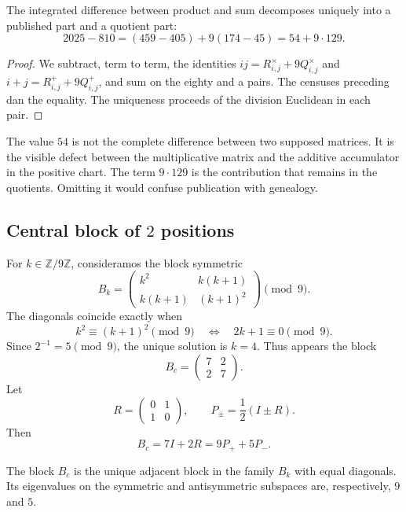 \begin{theorem}
\label{p12-83-c1-s1:thm:app-separacion-exceso}
The integrated difference between product and sum decomposes uniquely
into a published part and a quotient part:
\[
 \boxed{
  2025-810
  =(459-405)+9(174-45)
  =54+9\cdot129.}
\]
\end{theorem}

\begin{proof}
We subtract, term to term, the identities
\(ij=R^\times_{i,j}+9Q^\times_{i,j}\) and
\(i+j=R^+_{i,j}+9Q^+_{i,j}\), and sum on the eighty and a pairs. The
censuses preceding dan the equality. The uniqueness proceeds of the division
Euclidean in each pair.
\end{proof}

The value \(54\) is not the complete difference between two supposed matrices.
It is the visible defect between the multiplicative matrix and the additive accumulator
in the positive chart. The term \(9\cdot129\) is the contribution
that remains in the quotients. Omitting it would confuse publication with
genealogy.

\subsection{Central block of \(2\) positions}

For \(k\in\mathbb Z/9\mathbb Z\), consideramos the block symmetric
\[
 B_k=
 \begin{pmatrix}
  k^2&k(k+1)\\
  k(k+1)&(k+1)^2
 \end{pmatrix}\pmod9.
\]
The diagonals coincide exactly when
\[
 k^2\equiv(k+1)^2\pmod9
 \quad\Longleftrightarrow\quad
 2k+1\equiv0\pmod9.
\]
Since \(2^{-1}=5\pmod9\), the unique solution is \(k=4\). Thus appears the
block
\[
 B_c=
 \begin{pmatrix}7&2\\2&7\end{pmatrix}.
\]
Let
\[
 R=\begin{pmatrix}0&1\\1&0\end{pmatrix},
 \qquad
 P_\pm=\frac12(I\pm R).
\]
Then
\[
 B_c=7I+2R=9P_++5P_-.
\]

\begin{theorem}
\label{p12-83-c1-s1:thm:app-bloque-central}
The block \(B_c\) is the unique adjacent block in the family \(B_k\) with
equal diagonals. Its eigenvalues on the symmetric and
antisymmetric subspaces are, respectively, \(9\) and \(5\).
\end{theorem}

